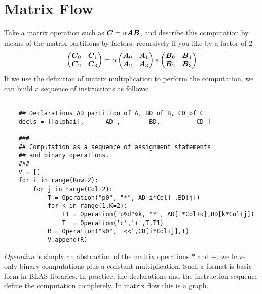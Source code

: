 \documentclass[acmsmall]{acmart}
\begin{document}
\section{Matrix Flow}
\label{sec:matrixflow}

Take a matrix operation such as ${\boldsymbol C} = \alpha {\boldsymbol A}{\boldsymbol B}$, and
describe this computation by means of the matrix partitions by
factors: recursively if you like by a factor of 2
\begin{equation}
  \label{basic_2}
  \begin{pmatrix}
    {\boldsymbol C}_0 & {\boldsymbol C}_1 \\
    {\boldsymbol C}_2 & {\boldsymbol C}_3 \\
  \end{pmatrix} = \alpha
  \begin{pmatrix}
    {\boldsymbol A}_0 & {\boldsymbol A}_1 \\
    {\boldsymbol A}_2 & {\boldsymbol A}_3 \\
  \end{pmatrix} *
  \begin{pmatrix}
    {\boldsymbol B}_0 & {\boldsymbol B}_1 \\
    {\boldsymbol B}_2 & {\boldsymbol B}_3 \\
  \end{pmatrix} 
\end{equation}
If we use the definition of matrix multiplication to perform the
computation, we can build a sequence of instructions as follows:
\begin{verbatim}

    ## Declarations AD partition of A, BD of B, CD of C 
    decls = [[alphai],      AD ,        BD,          CD ]     

    ###
    ## Computation as a sequence of assignment statements
    ## and binary operations.  
    ###
    V = []
    for i in range(Row=2):
        for j in range(Col=2):
            T = Operation("p0", "*", AD[i*Col] ,BD[j])
            for k in range(1,K=2):
                T1 = Operation("p%d"%k, "*", AD[i*Col+k],BD[k*Col+j])
                T  = Operation('c','+',T,T1)
            R = Operation("s0", '<<',CD[i*Col+j],T)
            V.append(R)
\end{verbatim}
{\em Operation} is simply an abstraction of the matrix operations $*$
and $+$, we have only binary computations plus a constant
multiplication. Such a format is basic form in BLAS libraries. In
practice, the declarations and the instruction sequence define the
computation completely. In matrix flow this is a graph.







%

 

%
\end{document}
